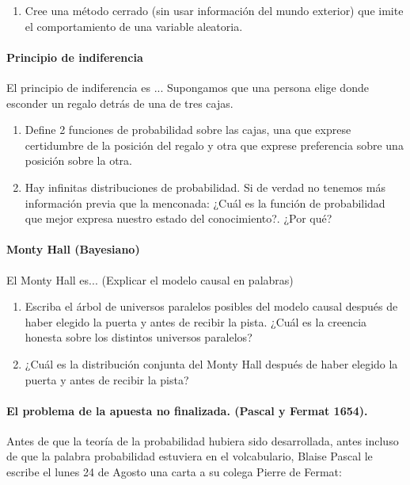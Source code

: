 \documentclass[a4paper,10pt]{article}
\begin{document}
\begin{enumerate}[resume]
\item Cree una método cerrado (sin usar información del mundo exterior) que imite el comportamiento de una variable aleatoria. 
\end{enumerate}

\paragraph{Principio de indiferencia} El principio de indiferencia es ...  Supongamos que una persona elige donde esconder un regalo detrás de una de tres cajas.

\begin{enumerate}
\item Define 2 funciones de probabilidad sobre las cajas, una que exprese certidumbre de la posición del regalo y otra que exprese preferencia sobre una posición sobre la otra.
\item Hay infinitas distribuciones de probabilidad. Si de verdad no tenemos más información previa que la menconada: ¿Cuál es la función de probabilidad que mejor expresa nuestro estado del conocimiento?. ¿Por qué?
\end{enumerate}


\paragraph{Monty Hall (Bayesiano)} El Monty Hall es... (Explicar el modelo causal en palabras)

\begin{enumerate}[resume]
\item Escriba el árbol de universos paralelos posibles del modelo causal después de haber elegido la puerta y antes de recibir la pista. ¿Cuál es la creencia honesta sobre los distintos universos paralelos?
\item ¿Cuál es la distribución conjunta del Monty Hall después de haber elegido la puerta y antes de recibir la pista?
\end{enumerate}

\paragraph{El problema de la apuesta no finalizada. (Pascal y Fermat 1654).}

Antes de que la teoría de la probabilidad hubiera sido desarrollada, antes incluso de que la palabra probabilidad estuviera en el volcabulario, Blaise Pascal le escribe el lunes 24 de Agosto una carta a su colega Pierre de Fermat:
\end{document}
